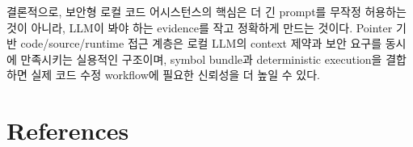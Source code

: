\documentclass[11pt,a4paper]{article}
\begin{document}
결론적으로, 보안형 로컬 코드 어시스턴스의 핵심은 더 긴 prompt를 무작정 허용하는 것이 아니라, LLM이 봐야 하는 evidence를 작고 정확하게 만드는 것이다. Pointer 기반 code/source/runtime 접근 계층은 로컬 LLM의 context 제약과 보안 요구를 동시에 만족시키는 실용적인 구조이며, symbol bundle과 deterministic execution을 결합하면 실제 코드 수정 workflow에 필요한 신뢰성을 더 높일 수 있다.

\clearpage
\section{References}
\begingroup
\renewcommand{\section}[2]{}


\endgroup
\end{document}

